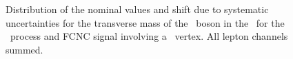 \begin{figure}[htbp]
{	}
	\caption{Distribution of the nominal values and shift due to systematic uncertainties for the transverse mass of the \PW\ boson in the \STSR\ for the \WZ\ process and FCNC signal involving a \Zut\ vertex. All lepton channels summed. }
\label{fig:shiftBDTSTZut12}
\end{figure}
